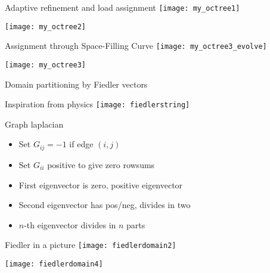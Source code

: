 \begin{numberedframe}{Adaptive refinement and load assignment}
  \texttt{[image: my\_octree1]}

  \texttt{[image: my\_octree2]}
\end{numberedframe}

\begin{numberedframe}{Assignment through Space-Filling Curve}
  \texttt{[image: my\_octree3\_evolve]}
  
  \texttt{[image: my\_octree3]}

\end{numberedframe}

 {Domain partitioning by Fiedler vectors}

\begin{numberedframe}{Inspiration from physics}
\texttt{[image: fiedlerstring]}
\end{numberedframe}

\begin{numberedframe}{Graph laplacian}
\begin{itemize}
\item Set $G_{ij}=-1$ if edge $(i,j)$
\item Set $G_{ii}$ positive to give zero rowsums
\item First eigenvector is zero, positive eigenvector
\item Second eigenvector has pos/neg, divides in two
\item $n$-th eigenvector divides in $n$ parts
\end{itemize}
\end{numberedframe}

\begin{numberedframe}{Fiedler in a picture}
\texttt{[image: fiedlerdomain2]}

\texttt{[image: fiedlerdomain4]}
\end{numberedframe}
